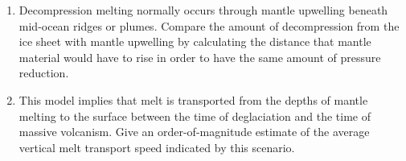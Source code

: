 \documentclass{template}
\newcommand{\solution}[1]{%
\iftoggle{showanswers}{%
\begin{solutionbox}
        #1
\end{solutionbox}%
  }{}%
}
\begin{document}
\begin{enumerate}[label=\textbf{\arabic*.}]
\begin{enumerate}[label=\Alph*)]
    \item Decompression melting normally occurs through mantle upwelling beneath mid-ocean ridges or plumes. Compare the amount of decompression from the ice sheet with mantle upwelling by calculating the distance that mantle material would have to rise in order to have the same amount of pressure reduction.

    \solution{

        Assuming again no lateral heterogeneity and an upper mantle density of $\rho_{m}=\qty{3300}{\kg\per\m\cubed}$, the amount of mantle upwelling required to achieve a pressure reduction of \qty{13.5}{\MPa} is:

        \begin{align*}
            h &= \frac{\Delta P}{\rho_{m}g}\\
            &= \frac{\qty{1.35e7}{\Pa}}{\qty{3300}{\kg\per\m\cubed}\cdot\qty{9.81}{\m\per\s\squared}}\\
            &= \boxed{\qty{417}{\m}}
        \end{align*}

    }

    \item This model implies that melt is transported from the depths of mantle melting to the surface between the time of deglaciation and the time of massive volcanism. Give an order-of-magnitude estimate of the average vertical melt transport speed indicated by this scenario.

    \solution{

        Assuming a mantle melting depth of $\sim\qty{100}{\km}$ beneath Iceland, the average vertical melt transport speed can be calculated as:

        \begin{align*}
            v &= \frac{d}{t}\\
            &= \frac{\qty{100}{\km}}{\qty{12}{kyr} - \qty{11}{kyr}}\\
            &= \frac{\qty{100}{\km}}{\qty{1000}{ yr}}\\
            &= \qty{0.1}{\km\per yr} = \boxed{\qty{100}{\m\per yr} }%
        \end{align*}

        This is fast, but consistent with constraints on melt speed in the upper mantle that indicate melt transport speeds in the range of 1--100\unit{\m\per yr} \parencite{KatzPhysicsofMeltExtraction2022}.

    }
\end{enumerate}


\end{enumerate}
\end{document}

